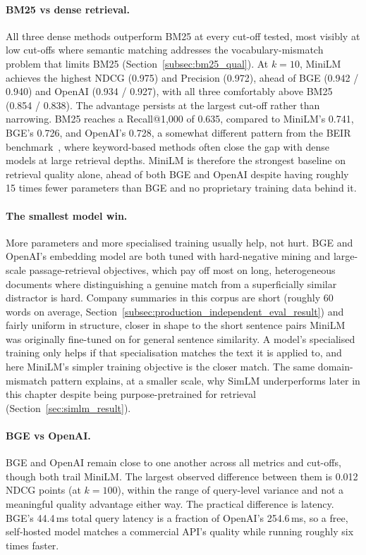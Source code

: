 \documentclass[a4paper,oneside,bibliography=totoc]{scrbook}
\begin{document}
\paragraph{BM25 vs dense retrieval.} All three dense methods outperform BM25 at every cut-off tested, most visibly at low cut-offs where semantic matching addresses the vocabulary-mismatch problem that limits BM25 (Section~\ref{subsec:bm25_qual}). At $k=10$, MiniLM achieves the highest NDCG (0.975) and Precision (0.972), ahead of BGE (0.942 / 0.940) and OpenAI (0.934 / 0.927), with all three comfortably above BM25 (0.854 / 0.838). The advantage persists at the largest cut-off rather than narrowing. BM25 reaches a Recall@1{,}000 of 0.635, compared to MiniLM's 0.741, BGE's 0.726, and OpenAI's 0.728, a somewhat different pattern from the BEIR benchmark~\citep{thakur2021beir}, where keyword-based methods often close the gap with dense models at large retrieval depths. MiniLM is therefore the strongest baseline on retrieval quality alone, ahead of both BGE and OpenAI despite having roughly 15 times fewer parameters than BGE and no proprietary training data behind it.

\paragraph{The smallest model win.} More parameters and more specialised training usually help, not hurt. BGE and OpenAI's embedding model are both tuned with hard-negative mining and large-scale passage-retrieval objectives, which pay off most on long, heterogeneous documents where distinguishing a genuine match from a superficially similar distractor is hard. Company summaries in this corpus are short (roughly 60 words on average, Section~\ref{subsec:production_independent_eval_result}) and fairly uniform in structure, closer in shape to the short sentence pairs MiniLM was originally fine-tuned on for general sentence similarity. A model's specialised training only helps if that specialisation matches the text it is applied to, and here MiniLM's simpler training objective is the closer match. The same domain-mismatch pattern explains, at a smaller scale, why SimLM underperforms later in this chapter despite being purpose-pretrained for retrieval (Section~\ref{sec:simlm_result}).

\paragraph{BGE vs OpenAI.} BGE and OpenAI remain close to one another across all metrics and cut-offs, though both trail MiniLM. The largest observed difference between them is 0.012 NDCG points (at $k=100$), within the range of query-level variance and not a meaningful quality advantage either way. The practical difference is latency. BGE's 44.4\,ms total query latency is a fraction of OpenAI's 254.6\,ms, so a free, self-hosted model matches a commercial API's quality while running roughly six times faster.
\end{document}

